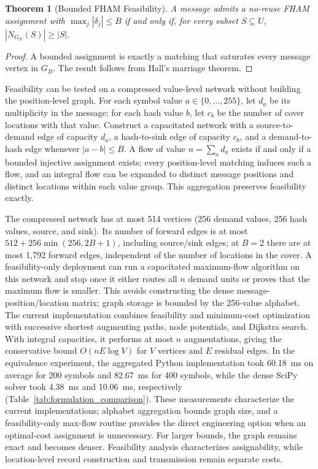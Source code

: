 \documentclass[preprint,12pt]{elsarticle}
\theoremstyle{plain}
\newtheorem{theorem}{Theorem}
\begin{document}
\begin{theorem}[Bounded FHAM Feasibility]
\label{thm:bounded_feasibility}
A message admits a no-reuse FHAM assignment with
$\max_j|\delta_j|\leq B$ if and only if, for every subset $S\subseteq U$,
$|N_{G_B}(S)|\geq|S|$.
\end{theorem}
\begin{proof}
A bounded assignment is exactly a matching that saturates every message vertex
in $G_B$. The result follows from Hall's marriage theorem.
\end{proof}

Feasibility can be tested on a compressed value-level network without building
the position-level graph. For each symbol value $a\in\{0,\ldots,255\}$, let $d_a$ be its
multiplicity in the message; for each hash value $b$, let $c_b$ be the number
of cover locations with that value. Construct a capacitated network with a
source-to-demand edge of capacity $d_a$, a hash-to-sink edge of capacity
$c_b$, and a demand-to-hash edge whenever $|a-b|\leq B$. A flow of value
$n=\sum_a d_a$ exists if and only if a bounded injective assignment exists:
every position-level matching induces such a flow, and an integral flow can
be expanded to distinct message positions and distinct locations within each
value group. This aggregation preserves feasibility exactly.

The compressed network has at most 514 vertices (256 demand values, 256 hash
values, source, and sink). Its number of forward edges is at most
$512+256\min(256,2B+1)$, including source/sink edges; at $B=2$ there are at
most 1,792 forward edges, independent of the number of locations in the
cover. A feasibility-only deployment can run a capacitated maximum-flow
algorithm on this network and stop once it either routes all $n$ demand units
or proves that the maximum flow is smaller. This avoids constructing the
dense message-position/location matrix; graph storage is bounded by the
256-value alphabet. The current implementation combines feasibility and
minimum-cost optimization with successive shortest augmenting paths, node
potentials, and Dijkstra search. With integral capacities, it performs at
most $n$ augmentations, giving the conservative bound
$O(nE\log V)$ for $V$ vertices and $E$ residual edges. In the equivalence
experiment, the aggregated Python implementation took 60.18~ms on average
for 200 symbols and 82.67~ms for 400 symbols, while the dense SciPy solver
took 4.38~ms and 10.06~ms, respectively (Table~\ref{tab:formulation_comparison}).
These measurements characterize the current implementations; alphabet
aggregation bounds graph size, and a feasibility-only max-flow routine
provides the direct engineering option when an optimal-cost assignment is
unnecessary. For larger bounds, the graph remains exact and becomes denser.
Feasibility analysis characterizes assignability, while location-level record
construction and transmission remain separate costs.
\end{document}
